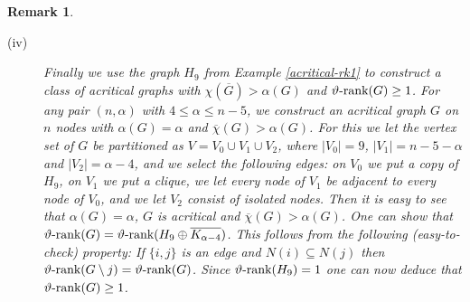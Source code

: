 \documentclass[11pt]{article}
\newtheorem{remark}[theorem]{Remark}
\numberwithin{equation}{section}
\newcommand{\rrank}{\vartheta\text{\rm -rank}}
\begin{document}
\begin{remark}
\begin{description}
\item[(iv)] Finally we use the graph $H_9$ from Example \ref{acritical-rk1} to construct a class of acritical graphs with $\chi(\overline G)>\alpha(G)$ and $\rrank(G)\ge 1$.	For any pair $(n,\alpha)$ with $4\le \alpha\le n-5$, we construct an acritical  graph $G$ on $n$ nodes with $\alpha(G)=\alpha$ and $\overline \chi(G)>\alpha(G)$. For this we let the vertex set of $G$ be partitioned as  $V=V_0\cup V_1\cup V_2$, where  $|V_0|=9$, $|V_1|= n-5-\alpha$ and $|V_2|=\alpha-4$,  and we select  the following edges: on $V_0$ we put a copy of $H_9$,  on $V_1$ we put a clique, we let  every node of $V_1$ be adjacent to every node of $V_0$, and we let $V_2$ consist of isolated nodes. Then it is easy to see that $\alpha(G)=\alpha$, $G$ is acritical and $\overline \chi(G)>\alpha(G)$. 
One can show that $\rrank(G)=\rrank(H_9\oplus \overline{K_{\alpha-4}})$. This follows from the following (easy-to-check) property: If $\{i,j\}$ is an edge and $N(i)\subseteq N(j)$ then $\rrank(G\setminus j)=\rrank(G)$. 
  Since $\rrank(H_9)=1$ one can now deduce that  $\rrank(G)\ge 1$. 
 \end{description}
\end{remark}
\end{document}
